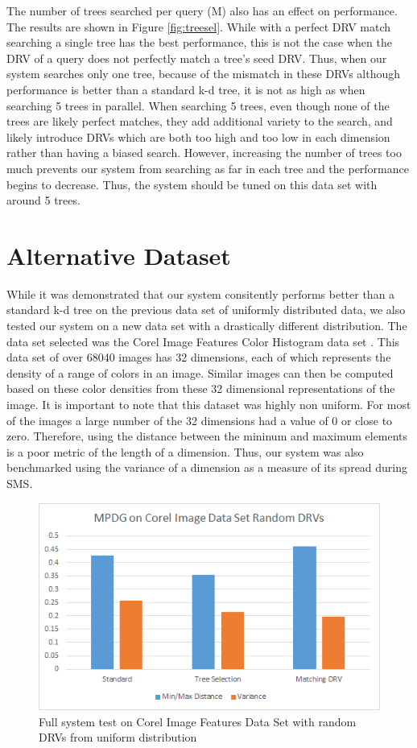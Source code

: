 The number of trees searched per query (M) also has an effect on performance.  The results are shown in Figure \ref{fig:treesel}.  While with a perfect DRV match searching a single tree has the best performance, this is not the case when the DRV of a query does not perfectly match a tree's seed DRV.  Thus, when our system searches only one tree, because of the mismatch in these DRVs although performance is better than a standard k-d tree, it is not as high as when searching 5 trees in parallel.  When searching 5 trees, even though none of the trees are likely perfect matches, they add additional variety to the search, and likely introduce DRVs which are both too high and too low in each dimension rather than having a biased search.  However, increasing the number of trees too much prevents our system from searching as far in each tree and the performance begins to decrease.  Thus, the system should be tuned on this data set with around 5 trees.

\section{Alternative Dataset}

While it was demonstrated that our system consitently performs better than a standard k-d tree on the previous data set of uniformly distributed data, we also tested our system on a new data set with a drastically different distribution.  The data set selected was the Corel Image Features Color Histogram data set \citep{corelimage}. This data set of over 68040 images has 32 dimensions, each of which represents the density of a range of colors in an image.  Similar images can then be computed based on these color densities from these 32 dimensional representations of the image.  It is important to note that this dataset was highly non uniform.  For most of the images a large number of the 32 dimensions had a value of 0 or close to zero.  Therefore, using the distance between the mininum and maximum elements is a poor metric of the length of a dimension.  Thus, our system was also benchmarked using the variance of a dimension as a measure of its spread during SMS.

\begin{figure}[h]
\begin{center}
\includegraphics[width=.85\textwidth]{Figures/altrand}
\end{center}
\caption{Full system test on Corel Image Features Data Set with random DRVs from uniform distribution}
\label{fig:altrand}
\end{figure}

